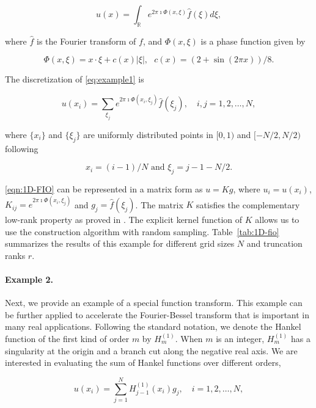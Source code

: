 \begin{equation}\label{eq:example1}
u(x) = \int_{\mathbb{R}}e^{2\pi \imath \Phi(x,\xi)}\widehat{f}(\xi)d\xi,
\end{equation}

where $\widehat{f}$ is the {Fourier} transform of $f$, and $\Phi(x,\xi)$ is a phase function given by

\begin{equation}
\Phi(x,\xi) = x\cdot \xi + c(x)|\xi|,~~~c(x) = (2+\sin(2\pi x))/8.
\label{eqn:1D-FIO-kernal}
\end{equation}

The discretization of \eqref{eq:example1} is

\begin{equation}
\label{eqn:1D-FIO}
u(x_i) = \sum_{\xi_j}e^{2\pi \imath \Phi(x_i,\xi_j)}\widehat{f}(\xi_j),
\quad i,j=1,2,\dots,N,
\end{equation}

where $\{x_i\}$ and $\{\xi_j\}$ are uniformly distributed points in $[0,1)$ and $[-N/2,N/2)$ following

\begin{equation}\label{eqn:1D-xandxi}
x_i = (i-1)/N \text{ and } \xi_j = j-1-N/2.
\end{equation}

\eqref{eqn:1D-FIO} can be represented in a matrix form as $u=Kg$, where $u_i=u(x_i)$, $K_{ij} = e^{2\pi\imath \Phi(x_i,\xi_j)}$ and $g_j = \widehat{f}(\xi_j)$.  The matrix $K$ satisfies the complementary low-rank property as proved in \cite{FIO09,FIO14}.  The explicit kernel function of $K$ allows us to use the construction algorithm with random sampling. Table~\ref{tab:1D-fio} summarizes the results of this example for different grid sizes $N$ and truncation ranks $r$.

\paragraph{Example 2.} Next, we provide an example of a special function transform. This example can be further applied to accelerate the Fourier-Bessel transform that is important in many real applications. Following the standard notation, we denote the {Hankel} function of the first kind of order $m$ by $H^{(1)}_m$.  When $m$ is an integer, $H^{(1)}_m$ has a singularity at the origin and a branch cut along the negative real axis.  We are interested in evaluating the sum of {Hankel} functions over different orders,

\begin{equation}
  \label{eqn:1D-special}
  u(x_i) = \sum_{j=1}^{N}H^{(1)}_{j-1}(x_i)g_j,
  \quad i=1,2,\dots,N,
\end{equation}

